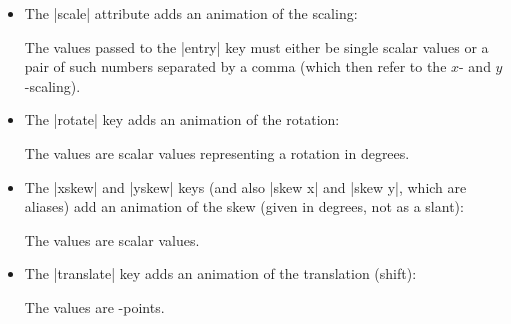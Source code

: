 \begin{itemize}
\item The |scale| attribute adds an animation of the scaling:
\begin{codeexample}[width=2.3cm]
\end{codeexample}
  The values passed to the |entry| key must either be single scalar
  values or a pair of such numbers separated by a comma (which then
  refer to the $x$- and $y$-scaling).
\item The |rotate| key adds an animation of the rotation:
\begin{codeexample}[width=2.3cm]
\end{codeexample}
  The values are scalar values representing a rotation in degrees.
\item The |xskew| and |yskew| keys (and also |skew x| and |skew y|,
  which are aliases) add an animation of the skew (given
  in degrees, not as a slant):
\begin{codeexample}[width=2.3cm]
\end{codeexample}
  The values are scalar values.
\item The |translate| key adds an animation of the translation (shift):
\begin{codeexample}[width=2.3cm]
\end{codeexample}
  The values are \pgfname-points.
\end{itemize}

